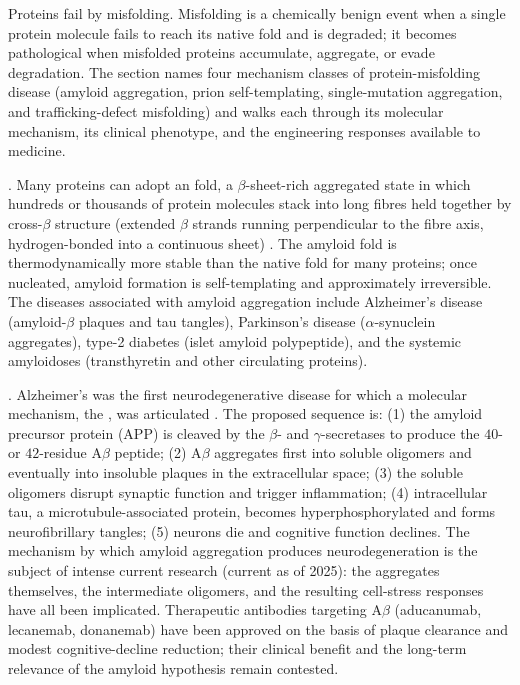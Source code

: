 Proteins fail by misfolding. Misfolding is a chemically benign event
when a single protein molecule fails to reach its native fold and is
degraded; it becomes pathological when misfolded proteins accumulate,
aggregate, or evade degradation. The section names four mechanism
classes of protein-misfolding disease (amyloid aggregation, prion
self-templating, single-mutation aggregation, and trafficking-defect
misfolding) and walks each through its molecular mechanism, its
clinical phenotype, and the engineering responses available to
medicine.

. Many proteins can adopt an
 fold, a $\beta$-sheet-rich aggregated state in which
hundreds or thousands of protein molecules stack into long fibres
held together by cross-$\beta$ structure (extended $\beta$ strands
running perpendicular to the fibre axis, hydrogen-bonded into a
continuous sheet) \cite{paper:v6c04-eisenberg-jucker-2012}. The
amyloid fold is thermodynamically more stable than the native fold
for many proteins; once nucleated, amyloid formation is
self-templating and approximately irreversible. The diseases
associated with amyloid aggregation include Alzheimer's disease
(amyloid-$\beta$ plaques and tau tangles), Parkinson's disease
($\alpha$-synuclein aggregates), type-2 diabetes (islet amyloid
polypeptide), and the systemic amyloidoses (transthyretin and other
circulating proteins).

. Alzheimer's was the first
neurodegenerative disease for which a molecular mechanism, the
, was articulated
\cite{paper:v6c04-hardy-higgins-1992}. The proposed sequence is: (1)
the amyloid precursor protein (APP) is cleaved by the
$\beta$- and $\gamma$-secretases to produce the $40$- or $42$-residue
A$\beta$ peptide; (2) A$\beta$ aggregates first into soluble
oligomers and eventually into insoluble plaques in the
extracellular space; (3) the soluble oligomers
\cite{paper:v6c04-walsh-selkoe-2007} disrupt synaptic function and
trigger inflammation; (4) intracellular tau, a microtubule-associated
protein, becomes hyperphosphorylated and forms neurofibrillary
tangles; (5) neurons die and cognitive function declines. The
mechanism by which amyloid aggregation produces neurodegeneration
is the subject of intense current research (current as of 2025):
the aggregates themselves, the intermediate oligomers, and the
resulting cell-stress responses have all been implicated. Therapeutic
antibodies targeting A$\beta$ (aducanumab, lecanemab, donanemab)
have been approved on the basis of plaque clearance and modest
cognitive-decline reduction; their clinical benefit and the long-term
relevance of the amyloid hypothesis remain contested.

